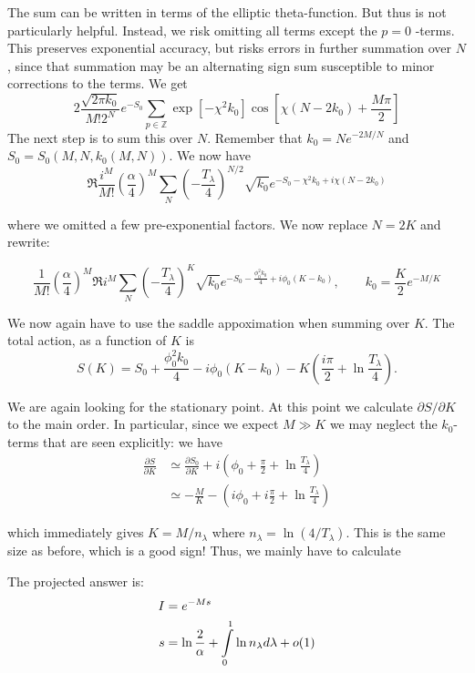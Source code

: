 The sum can be written in terms of the elliptic theta-function. But
thus is not particularly helpful. Instead, we risk omitting all terms
except the $p=0$ -terms. This preserves exponential accuracy, but
risks errors in further summation over $N$, since that summation
may be an alternating sign sum susceptible to minor corrections to
the terms. We get
\[
2\frac{\sqrt{2\pi k_{0}}}{M!2^{N}}e^{-S_{0}}\sum_{p\in\mathbb{Z}}\exp\left[-\chi^{2}k_{0}\right]\cos\left[\chi(N-2k_{0})+\frac{M\pi}{2}\right]
\]
The next step is to sum this over $N$. Remember that $k_{0}=Ne^{-2M/N}$
and $S_{0}=S_{0}(M,N,k_{0}(M,N))$. We now have
\[
\Re\frac{i^{M}}{M!}\left(\frac{\alpha}{4}\right)^{M}\sum_{N}\left(-\frac{T_{\lambda}}{4}\right)^{N/2}\sqrt{k_{0}}e^{-S_{0}-\chi^{2}k_{0}+i\chi(N-2k_{0})}
\]

where we omitted a few pre-exponential factors. We now replace $N=2K$
and rewrite:

\[
\frac{1}{M!}\left(\frac{\alpha}{4}\right)^{M}\Re i^{M}\sum_{N}\left(-\frac{T_{\lambda}}{4}\right)^{K}\sqrt{k_{0}}e^{-S_{0}-\frac{\phi_{0}^{2}k_{0}}{4}+i\phi_{0}(K-k_{0})},\qquad k_{0}=\frac{K}{2}e^{-M/K}
\]

We now again have to use the saddle appoximation when summing over
$K$. The total action, as a function of $K$ is
\[
S(K)=S_{0}+\frac{\phi_{0}^{2}k_{0}}{4}-i\phi_{0}(K-k_{0})-K\left(\frac{i\pi}{2}+\ln\frac{T_{\lambda}}{4}\right).
\]

We are again looking for the stationary point. At this point we calculate
$\partial S/\partial K$ to the main order. In particular, since we
expect $M\gg K$ we may neglect the $k_{0}$-terms that are seen explicitly:
we have
\begin{align*}
\frac{\partial S}{\partial K} & \simeq\frac{\partial S_{0}}{\partial K}+i\left(\phi_{0}+\frac{\pi}{2}+\ln\frac{T_{\lambda}}{4}\right)\\
& \simeq-\frac{M}{K}-\left(i\phi_{0}+i\frac{\pi}{2}+\ln\frac{T_{\lambda}}{4}\right)
\end{align*}

which immediately gives $K=M/n_{\lambda}$ where $n_{\lambda}=\ln(4/T_{\lambda})$.
This is the same size as before, which is a good sign! Thus, we mainly
have to calculate

The projected answer is:
\begin{align*}
I & =e^{-Ms}\\
s & =\ln\frac{2}{\alpha}+\intop_{0}^{1}\ln n_{\lambda}d\lambda+o(1)
\end{align*}

